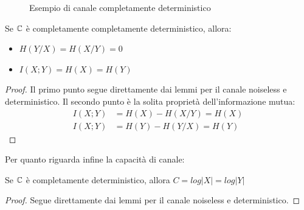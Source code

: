 \begin{figure}[htbp]
  \centering
  \hspace{1cm}
  \caption{Esempio di canale completamente deterministico}
  \label{fig:cdeterministico}
\end{figure}

\begin{lemma}
 Se $\mathbb{C}$ è completamente completamente deterministico, allora:
 \begin{itemize}
  \item $H(Y/X)=H(X/Y)=0$
  \item $I(X;Y)=H(X)=H(Y)$
 \end{itemize}
 \begin{proof}
  Il primo punto segue direttamente dai lemmi per il canale noiseless e deterministico.
  Il secondo punto è la solita proprietà dell'informazione mutua:
  \[\begin{split}
   I(X;Y)&=H(X)-H(X/Y)=H(X) \\
   I(X;Y)&=H(Y)-H(Y/X)=H(Y)
   \end{split}
  \]

 \end{proof}
\end{lemma}

\noindent
Per quanto riguarda infine la capacità di canale:

\begin{lemma}
Se $\mathbb{C}$ è completamente deterministico, allora $C=log|X|=log|Y|$
\begin{proof}
Segue direttamente dai lemmi per il canale noiseless e deterministico.
\end{proof}
\end{lemma}



